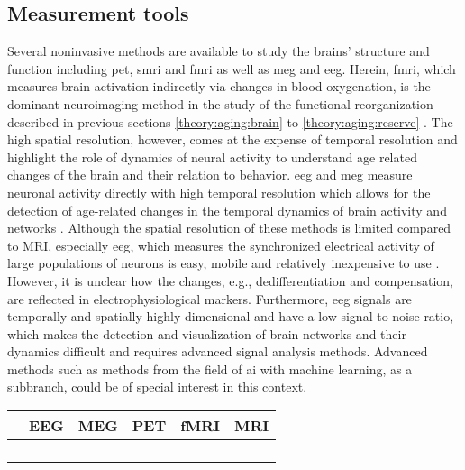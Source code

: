\subsection{Measurement tools}
Several noninvasive methods are available to study the brains' structure and function including \gls{pet}, \gls{smri} and \gls{fmri} as well as \gls{meg} and \gls{eeg}. Herein, \Gls{fmri}, which measures brain activation indirectly via changes in blood oxygenation, is the dominant neuroimaging method in the study of the functional reorganization described in previous sections \ref{theory:aging:brain} to \ref{theory:aging:reserve} \cite{Reuter-Lorenz2010}. The high spatial resolution, however, comes at the expense of temporal resolution and \citeauthor{Courtney2021} \cite{Courtney2021} highlight the role of dynamics of neural activity to understand age related changes of the brain and their relation to behavior. \Gls{eeg} and \gls{meg} measure neuronal activity directly with high temporal resolution which allows for the detection of age-related changes in the temporal dynamics of brain activity and networks \cite{Courtney2021}. Although the spatial resolution of these methods is limited compared to MRI, especially \gls{eeg}, which measures the synchronized electrical activity of large populations of neurons is easy, mobile and relatively inexpensive to use \cite{CohenX2017}. However, it is unclear how the changes, e.g., dedifferentiation and compensation, are reflected in electrophysiological markers. Furthermore, \gls{eeg} signals are temporally and spatially highly dimensional and have a low signal-to-noise ratio, which makes the detection and visualization of brain networks and their dynamics difficult and requires advanced signal analysis methods. Advanced methods such as methods from the field of \gls{ai} with machine learning, as a subbranch, could be of special interest in this context.\\
\begin{center}
\begin{tabular}{|c|c|c|c|c|c|}
\hline
     & EEG & MEG & PET & fMRI & MRI \\
\hline
 &  &  &  &  & \\
\hline
 &  &  &  &  & \\
\hline
 &  &  &  &  & \\
\hline
 &  &  &  &  & \\
\hline
\end{tabular}
\end{center}